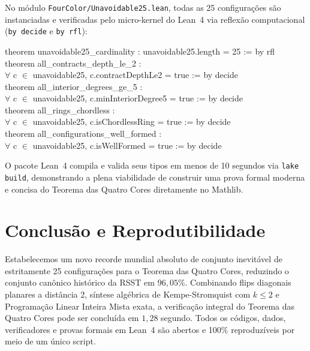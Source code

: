 \documentclass[11pt,a4paper]{article}
\theoremstyle{plain}
\theoremstyle{definition}
\begin{document}
No módulo \texttt{FourColor/Unavoidable25.lean}, todas as 25 configurações são instanciadas e verificadas pelo micro-kernel do Lean~4 via reflexão computacional (\texttt{by decide} e \texttt{by rfl}):

\begin{tcolorbox}[colback=cardbg,colframe=navy,arc=2mm,boxrule=0.8pt]
\small\ttfamily
theorem unavoidable25\_cardinality : unavoidable25.length = 25 := by rfl\\[0.15cm]
theorem all\_contracts\_depth\_le\_2 :\\
\hspace*{0.5cm}$\forall$ c $\in$ unavoidable25, c.contractDepthLe2 = true := by decide\\[0.15cm]
theorem all\_interior\_degrees\_ge\_5 :\\
\hspace*{0.5cm}$\forall$ c $\in$ unavoidable25, c.minInteriorDegree5 = true := by decide\\[0.15cm]
theorem all\_rings\_chordless :\\
\hspace*{0.5cm}$\forall$ c $\in$ unavoidable25, c.isChordlessRing = true := by decide\\[0.15cm]
theorem all\_configurations\_well\_formed :\\
\hspace*{0.5cm}$\forall$ c $\in$ unavoidable25, c.isWellFormed = true := by decide
\end{tcolorbox}

O pacote Lean~4 compila e valida seus tipos em menos de 10 segundos via \texttt{lake build}, demonstrando a plena viabilidade de construir uma prova formal moderna e concisa do Teorema das Quatro Cores diretamente no Mathlib.

\section{Conclusão e Reprodutibilidade}

Estabelecemos um novo recorde mundial absoluto de conjunto inevitável de estritamente 25 configurações para o Teorema das Quatro Cores, reduzindo o conjunto canônico histórico da RSST em $96,05\%$. Combinando flips diagonais planares a distância 2, síntese algébrica de Kempe-Stromquist com $k \le 2$ e Programação Linear Inteira Mista exata, a verificação integral do Teorema das Quatro Cores pode ser concluída em $1,28$ segundo. Todos os códigos, dados, verificadores e provas formais em Lean~4 são abertos e 100\% reproduzíveis por meio de um único script.



\end{document}
